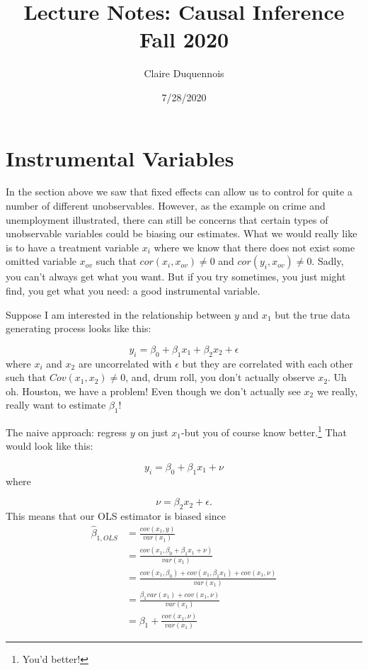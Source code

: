 \documentclass[
]{article}
\title{Lecture Notes: Causal Inference Fall 2020}
\author{Claire Duquennois}
\date{7/28/2020}
\begin{document}
\maketitle

{
\setcounter{tocdepth}{2}
\tableofcontents
}
\section{Instrumental Variables}

In the section above we saw that fixed effects can allow us to control
for quite a number of different unobservables. However, as the example
on crime and unemployment illustrated, there can still be concerns that
certain types of unobservable variables could be biasing our estimates.
What we would really like is to have a treatment variable \(x_i\) where
we know that there does not exist some omitted variable \(x_{ov}\) such
that \(cor(x_i,x_{ov})\neq 0\) and \(cor(y_i, x_{ov})\neq 0\). Sadly,
you can't always get what you want. But if you try sometimes, you just
might find, you get what you need: a good instrumental variable.

Suppose I am interested in the relationship between \(y\) and \(x_1\)
but the true data generating process looks like this:

\[
y_i=\beta_0+\beta_1x_1+\beta_2x_2+\epsilon
\] where \(x_i\) and \(x_2\) are uncorrelated with \(\epsilon\) but they
are correlated with each other such that \(Cov(x_1,x_2)\neq 0\), and,
drum roll, you don't actually observe \(x_2\). Uh oh. Houston, we have a
problem! Even though we don't actually see \(x_2\) we really, really
want to estimate \(\beta_1\)!

The naive approach: regress \(y\) on just \(x_1\)-but you of course know
better.\footnote{You'd better!} That would look like this:

\[
y_i=\beta_0+\beta_1x_1+\nu
\] where

\[
\nu=\beta_2x_2+\epsilon.
\] This means that our OLS estimator is biased since \[
\begin{aligned}
\hat{\beta}_{1,OLS}&=\frac{cov(x_1,y)}{var(x_1)}\\
&=\frac{cov(x_1,\beta_0+\beta_1x_1+\nu)}{var(x_1)}\\
&=\frac{cov(x_1, \beta_0)+cov(x_1,\beta_1x_1)+cov(x_1,\nu)}{var(x_1)}\\
&=\frac{\beta_1var(x_1)+cov(x_1,\nu)}{var(x_1)}\\
&=\beta_1+\frac{cov(x_1,\nu)}{var(x_1)}
\end{aligned}
\]
\end{document}
